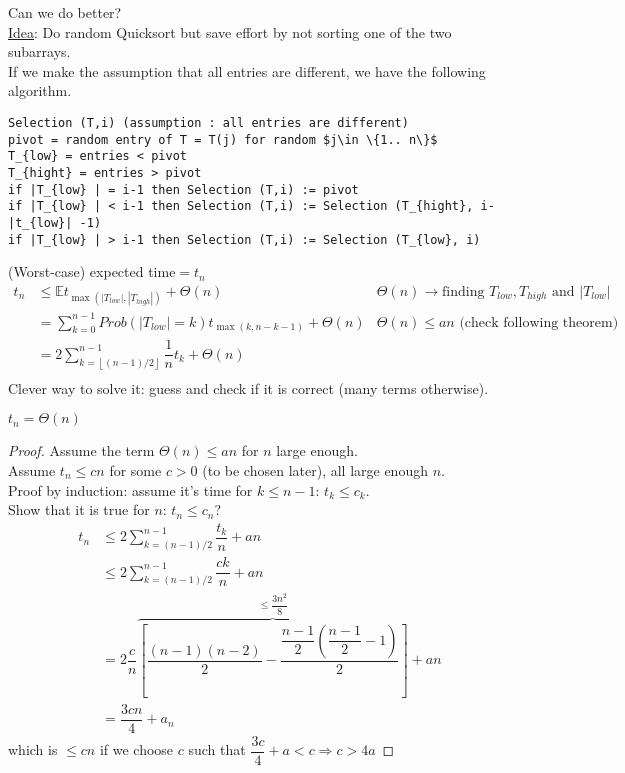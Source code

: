 Can we do better?\\
\underline{Idea}: Do random Quicksort but save effort by not sorting one of the two subarrays.\\

If we make the assumption that all entries are different, we have the following algorithm.

\begin{lstlisting}[label={list:c3:select},caption={Selection (T,i)}]
Selection (T,i) (assumption : all entries are different)
pivot = random entry of T = T(j) for random $j\in \{1.. n\}$
T_{low} = entries < pivot
T_{hight} = entries > pivot
if |T_{low} | = i-1 then Selection (T,i) := pivot
if |T_{low} | < i-1 then Selection (T,i) := Selection (T_{hight}, i-|t_{low}| -1)
if |T_{low} | > i-1 then Selection (T,i) := Selection (T_{low}, i)
\end{lstlisting}

(Worst-case) expected time$=t_n$\\
\begin{align*}
t_n &\leq \mathbb{E} t_{\max(|T_{low}|,|T_{high}|)}+\Theta (n) & \Theta (n)\rightarrow \text{finding }T_{low},T_{high}\text{ and }|T_{low}|\\
&=\sum\limits_{k=0}^{n-1}Prob(|T_{low}|=k)t_{\max(k,n-k-1)}+\Theta (n) & \Theta (n)\leq an \text{ (check following theorem)}\\
&=2\sum\limits_{k=\left\lfloor (n-1)/2\right\rfloor}^{n-1}\dfrac{1}{n}t_k+\Theta (n)&\\
\end{align*}
Clever way to solve it: guess and check if it is correct (many terms otherwise).\\

\begin{theorem}
$t_n=\Theta (n)$
\end{theorem}
\begin{proof}
Assume the term $\Theta (n)\leq an$ for $n$ large enough.\\
Assume $t_n\leq cn$ for some $c>0$ (to be chosen later), all large enough $n$.\\
Proof by induction: assume it's time for $k\leq n-1$: $t_k\leq c_k$.\\
Show that it is true for $n$: $t_n\leq c_n$?
\begin{align*}
t_n &\leq 2\sum\limits_{k=(n-1)/2}^{n-1}\dfrac{t_k}{n}+an\\
&\leq 2\sum\limits_{k=(n-1)/2}^{n-1}\dfrac{ck}{n}+an\\
&=2\dfrac{c}{n}\overbrace{\left[\dfrac{(n-1)(n-2)}{2}-\dfrac{\dfrac{n-1}{2}\left(\dfrac{n-1}{2}-1\right)}{2}\right]}\limits^{\leq \dfrac{3n^2}{8}}+an\\
&=\dfrac{3cn}{4}+a_n
\end{align*}
which is $\leq cn$ if we choose $c$ such that $\dfrac{3c}{4}+a<c \Rightarrow c>4a$
\end{proof}


%
